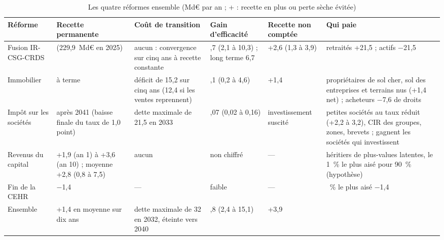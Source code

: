 \begin{table}[!htbp]\centering\scriptsize
\caption{Les quatre réformes ensemble (Md€ par an ; + : recette en plus ou perte sèche évitée)}\label{tab:ens_tableau}
\setlength{\tabcolsep}{3.5pt}
\begin{tabularx}{\linewidth}{@{}>{\raggedright\arraybackslash}p{1.75cm}>{\raggedright\arraybackslash}p{2.15cm}>{\raggedright\arraybackslash}p{2.15cm}>{\raggedright\arraybackslash}p{1.75cm}>{\raggedright\arraybackslash}p{1.95cm}>{\raggedright\arraybackslash}X@{}}
\toprule
Réforme & Recette permanente & Coût de transition & Gain d'efficacité & Recette non comptée & Qui paie \\
\midrule
Fusion IR-CSG-CRDS & 0 (229,9~Md€ en 2025) & aucun : convergence sur cinq ans à recette constante & 4,7 (2,1 à 10,3) ;
long terme 6,7 & +2,6 (1,3 à 3,9) & retraités +21,5 ; actifs $-$21,5 \\
Immobilier & 0 à terme & déficit de 15,2 sur cinq ans (12,4 si les ventes reprennent) & 2,1 (0,2 à 4,6) & +1,4 &
propriétaires de sol cher, sol des entreprises et terrains nus (+1,4 net) ; acheteurs $-$7,6 de droits \\
Impôt sur les sociétés & 0 après 2041 (baisse finale du taux de 1,0 point) & dette maximale de 21,5 en 2033 &
0,07 (0,02 à 0,16) & investissement suscité & petites sociétés au taux réduit (+2,2 à 3,2), CIR des groupes, zones,
brevets ; gagnent les sociétés qui investissent \\
Revenus du capital & +1,9 (an 1) à +3,6 (an 10) ; moyenne +2,8 (0,8 à 7,5) & aucun & non chiffré & --- & héritiers de
plus-values latentes, le 1~\% le plus aisé pour 90~\% (hypothèse) \\
Fin de la CEHR & $-$1,4 & --- & faible & --- & 1~\% le plus aisé $-$1,4 \\
\midrule
Ensemble & +1,4 en moyenne sur dix ans & dette maximale de 32 en 2032, éteinte vers 2040 & 6,8 (2,4 à 15,1) & +3,9 & \\
\bottomrule
\end{tabularx}
\par{}
\end{table}

